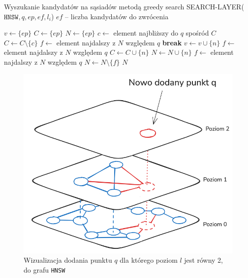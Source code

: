 \documentclass[twocolumn]{article}
\begin{document}
\begin{algorithm}[H]
\caption{Wyszukanie kandydatów na sąsiadów metodą greedy search \newline
SEARCH-LAYER($\texttt{HNSW}, q, ep, ef, l_i$)
\newline $ef$ -- liczba kandydatów do zwrócenia
}
\label{alg:greedy}
\begin{algorithmic}[1]
\STATE $v \leftarrow \{ep\}$ 
\STATE $C \leftarrow \{ep\}$ 
\STATE $N \leftarrow \{ep\}$ 
    \STATE $c \leftarrow$ element najbliższy do $q$ spośród $C$
    \STATE $C \leftarrow C \setminus \{c\}$ 
    \STATE $f \leftarrow$ element najdalszy z $N$ względem $q$
        \STATE \textbf{break} 
    \ENDIF
            \STATE $v \leftarrow v \cup \{n\}$
            \STATE $f \leftarrow$ element najdalszy z $N$ względem $q$
                \STATE $C \leftarrow C \cup \{n\}$
                \STATE $N \leftarrow N \cup \{n\}$
                    \STATE $f \leftarrow$ element najdalszy z $N$ względem $q$
                    \STATE $N \leftarrow N \setminus \{f\}$ 
                \ENDIF
            \ENDIF
        \ENDIF
    \ENDFOR
\ENDWHILE
\RETURN $N$
\end{algorithmic}
\end{algorithm}

\begin{figure}[H]
    \centering
    \includegraphics[width=1\linewidth]{Figure_2.png}
    \caption{Wizualizacja dodania punktu $q$ dla którego poziom $l$ jest równy 2, do grafu \texttt{HNSW}}
    \label{fig:2}
\end{figure}
\end{document}
